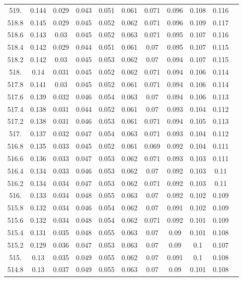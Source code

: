 \documentclass[12pt]{ctexart}
\numberwithin{equation}{section}
\begin{document}
\begin{longtable}{ccccccccccc}
519.	&	0.144	&	0.029	&	0.043	&	0.051	&	0.061	&	0.071	&	0.096	&	0.108	&	0.116	\\
518.8	&	0.145	&	0.029	&	0.045	&	0.052	&	0.062	&	0.071	&	0.096	&	0.109	&	0.117	\\
518.6	&	0.143	&	0.03	&	0.045	&	0.052	&	0.063	&	0.071	&	0.095	&	0.107	&	0.116	\\
518.4	&	0.142	&	0.029	&	0.044	&	0.051	&	0.061	&	0.07	&	0.095	&	0.107	&	0.115	\\
518.2	&	0.142	&	0.03	&	0.045	&	0.053	&	0.062	&	0.07	&	0.094	&	0.107	&	0.115	\\
518.	&	0.14	&	0.031	&	0.045	&	0.052	&	0.062	&	0.071	&	0.094	&	0.106	&	0.114	\\
517.8	&	0.141	&	0.03	&	0.045	&	0.052	&	0.061	&	0.071	&	0.094	&	0.106	&	0.114	\\
517.6	&	0.139	&	0.032	&	0.046	&	0.054	&	0.063	&	0.07	&	0.094	&	0.106	&	0.113	\\
517.4	&	0.138	&	0.031	&	0.044	&	0.052	&	0.061	&	0.07	&	0.093	&	0.104	&	0.112	\\
517.2	&	0.138	&	0.031	&	0.046	&	0.053	&	0.061	&	0.071	&	0.094	&	0.105	&	0.113	\\
517.	&	0.137	&	0.032	&	0.047	&	0.054	&	0.063	&	0.071	&	0.093	&	0.104	&	0.112	\\
516.8	&	0.135	&	0.033	&	0.045	&	0.052	&	0.061	&	0.069	&	0.092	&	0.104	&	0.111	\\
516.6	&	0.136	&	0.033	&	0.047	&	0.053	&	0.062	&	0.071	&	0.093	&	0.103	&	0.111	\\
516.4	&	0.134	&	0.033	&	0.046	&	0.053	&	0.062	&	0.07	&	0.092	&	0.103	&	0.11	\\
516.2	&	0.134	&	0.034	&	0.047	&	0.053	&	0.062	&	0.071	&	0.092	&	0.103	&	0.11	\\
516.	&	0.133	&	0.034	&	0.048	&	0.055	&	0.063	&	0.07	&	0.092	&	0.102	&	0.109	\\
515.8	&	0.132	&	0.034	&	0.046	&	0.054	&	0.062	&	0.07	&	0.091	&	0.102	&	0.109	\\
515.6	&	0.132	&	0.034	&	0.048	&	0.054	&	0.062	&	0.071	&	0.092	&	0.101	&	0.109	\\
515.4	&	0.131	&	0.035	&	0.048	&	0.055	&	0.063	&	0.07	&	0.09	&	0.101	&	0.108	\\
515.2	&	0.129	&	0.036	&	0.047	&	0.053	&	0.063	&	0.07	&	0.09	&	0.1	&	0.107	\\
515.	&	0.13	&	0.035	&	0.049	&	0.055	&	0.062	&	0.07	&	0.091	&	0.1	&	0.108	\\
514.8	&	0.13	&	0.037	&	0.049	&	0.055	&	0.063	&	0.07	&	0.09	&	0.101	&	0.108	\\

\end{longtable}
\end{document}
